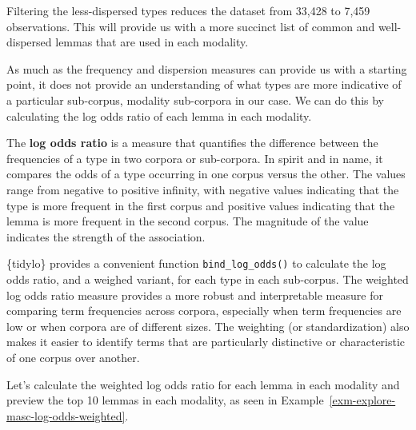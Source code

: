\documentclass[
  letterpaper,
  krantz1]{latex/krantz-mod}
\theoremstyle{definition}
\theoremstyle{definition}
\theoremstyle{remark}
\begin{document}
Filtering the less-dispersed types reduces the dataset from 33,428 to
7,459 observations. This will provide us with a more succinct list of
common and well-dispersed lemmas that are used in each modality.

As much as the frequency and dispersion measures can provide us with a
starting point, it does not provide an understanding of what types are
more indicative of a particular sub-corpus, modality sub-corpora in our
case. We can do this by calculating the log odds ratio of each lemma in
each modality.

The \textbf{log odds ratio} is a measure that
quantifies the difference between the frequencies of a type in two
corpora or sub-corpora. In spirit and in name, it compares the odds of a
type occurring in one corpus versus the other. The values range from
negative to positive infinity, with negative values indicating that the
type is more frequent in the first corpus and positive values indicating
that the lemma is more frequent in the second corpus. The magnitude of
the value indicates the strength of the association.

\{tidylo\} provides a convenient function \texttt{bind\_log\_odds()} to
calculate the log odds ratio, and a weighed variant, for each type in
each sub-corpus. The weighted log odds ratio measure provides a more
robust and interpretable measure for comparing term frequencies across
corpora, especially when term frequencies are low or when corpora are of
different sizes. The weighting (or
standardization) also makes it easier to identify
terms that are particularly distinctive or characteristic of one corpus
over another.

Let's calculate the weighted log odds ratio for each lemma in each
modality and preview the top 10 lemmas in each modality, as seen in
Example~\ref{exm-explore-masc-log-odds-weighted}.

\pagebreak
\end{document}
